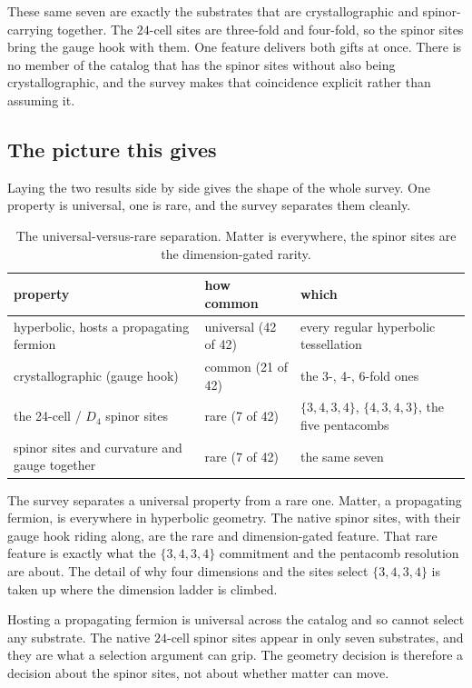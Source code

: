 These same seven are exactly the substrates that are crystallographic and spinor-carrying together. The $24$-cell sites are three-fold and four-fold, so the spinor sites bring the gauge hook with them. One feature delivers both gifts at once. There is no member of the catalog that has the spinor sites without also being crystallographic, and the survey makes that coincidence explicit rather than assuming it.

\subsection{The picture this gives}

Laying the two results side by side gives the shape of the whole survey. One property is universal, one is rare, and the survey separates them cleanly.

\begin{table}[ht]
\centering
\begin{tabular}{@{}lll@{}}
\toprule
property & how common & which \\
\midrule
hyperbolic, hosts a propagating fermion & universal (42 of 42) & every regular hyperbolic tessellation \\
crystallographic (gauge hook) & common (21 of 42) & the 3-, 4-, 6-fold ones \\
the 24-cell / $D_4$ spinor sites & rare (7 of 42) & $\{3,4,3,4\}$, $\{4,3,4,3\}$, the five pentacombs \\
spinor sites and curvature and gauge together & rare (7 of 42) & the same seven \\
\bottomrule
\end{tabular}
\caption{The universal-versus-rare separation. Matter is everywhere, the spinor sites are the dimension-gated rarity.}
\label{tab:rare-vs-universal}
\end{table}

The survey separates a universal property from a rare one. Matter, a propagating fermion, is everywhere in hyperbolic geometry. The native spinor sites, with their gauge hook riding along, are the rare and dimension-gated feature. That rare feature is exactly what the $\{3,4,3,4\}$ commitment and the pentacomb resolution are about. The detail of why four dimensions and the sites select $\{3,4,3,4\}$ is taken up where the dimension ladder is climbed.

\begin{principle}
Hosting a propagating fermion is universal across the catalog and so cannot select any substrate. The native $24$-cell spinor sites appear in only seven substrates, and they are what a selection argument can grip. The geometry decision is therefore a decision about the spinor sites, not about whether matter can move.
\end{principle}

